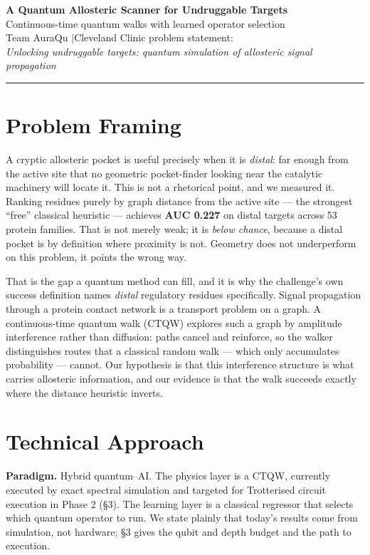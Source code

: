 \documentclass[10pt,a4paper]{article}
\newcommand{\num}[1]{\textbf{#1}}
\begin{document}
\pagestyle{empty}

\begin{center}
{\Large\bfseries A Quantum Allosteric Scanner for Undruggable Targets}\\[2pt]
{\large Continuous-time quantum walks with learned operator selection}\\[4pt]
{\normalsize Team AuraQu \quad$\vert$\quad Cleveland Clinic problem statement:\\
\emph{Unlocking undruggable targets: quantum simulation of allosteric signal propagation}}
\end{center}
\vspace{-4pt}\hrule\vspace{6pt}

\section{Problem Framing}

A cryptic allosteric pocket is useful precisely when it is \emph{distal}: far enough from the
active site that no geometric pocket-finder looking near the catalytic machinery will locate it.
This is not a rhetorical point, and we measured it. Ranking residues purely by graph distance from
the active site --- the strongest ``free'' classical heuristic --- achieves \num{AUC 0.227} on
distal targets across 53 protein families. That is not merely weak; it is \emph{below chance},
because a distal pocket is by definition where proximity is not. Geometry does not underperform on
this problem, it points the wrong way.

That is the gap a quantum method can fill, and it is why the challenge's own success definition
names \emph{distal} regulatory residues specifically. Signal propagation through a protein contact
network is a transport problem on a graph. A continuous-time quantum walk (CTQW) explores such a
graph by amplitude interference rather than diffusion: paths cancel and reinforce, so the walker
distinguishes routes that a classical random walk --- which only accumulates probability ---
cannot. Our hypothesis is that this interference structure is what carries allosteric information,
and our evidence is that the walk succeeds exactly where the distance heuristic inverts.

\section{Technical Approach}

\textbf{Paradigm.} Hybrid quantum--AI. The physics layer is a CTQW, currently executed by exact
spectral simulation and targeted for Trotterised circuit execution in Phase 2 (\S3). The learning
layer is a classical regressor that selects which quantum operator to run. We state plainly that
today's results come from simulation, not hardware; \S3 gives the qubit and depth budget and the
path to execution.
\end{document}
